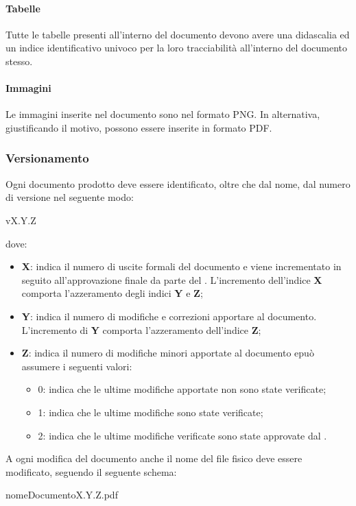 \paragraph{Tabelle}
Tutte le tabelle presenti all'interno del documento devono avere una didascalia 
ed un indice identificativo univoco per la loro tracciabilità all'interno del 
documento stesso.
\paragraph{Immagini}
Le immagini inserite nel documento sono nel formato PNG. In alternativa, 
giustificando il motivo, possono essere inserite in formato PDF.
\subsubsection{Versionamento}
Ogni documento prodotto deve essere identificato, oltre che dal nome, dal numero 
di versione nel seguente modo:
\begin{center}
  vX.Y.Z
\end{center}
dove:
\begin{itemize}
  \item \textbf{X}: indica il numero di uscite formali del documento e viene 
  incrementato in seguito all'approvazione finale da parte del \textit{\RdP}. 
  L'incremento dell'indice \textbf{X} comporta l'azzeramento degli indici 
  \textbf{Y} e \textbf{Z};
  \item \textbf{Y}: indica il numero di modifiche e correzioni apportare al 
  documento. L'incremento di \textbf{Y} comporta l'azzeramento dell'indice 
  \textbf{Z};
  \item \textbf{Z}: indica il numero di modifiche minori apportate al documento epuò assumere i seguenti valori:
  \begin{itemize}
    \item 0: indica che le ultime modifiche apportate non sono state verificate;
    \item 1: indica che le ultime modifiche sono state verificate;
    \item 2: indica che le ultime modifiche verificate sono state approvate dal 
    \textit{\RdP}.
  \end{itemize} 
\end{itemize}
A ogni modifica del documento anche il nome del file fisico deve essere 
modificato, seguendo il seguente schema:
\begin{center}
  nomeDocumentoX.Y.Z.pdf
\end{center}

